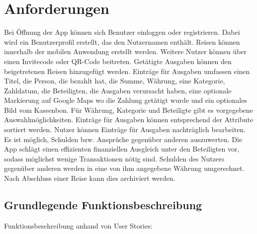 \section{Anforderungen}

Bei Öffnung der App können sich Benutzer einloggen oder registrieren.
Dabei wird ein Benutzerprofil erstellt, das den Nutzernamen enthält.
Reisen können innerhalb der mobilen Anwendung erstellt werden.
Weitere Nutzer können über einen Invitecode oder QR-Code beitreten.
Getätigte Ausgaben können den beigetretenen Reisen hinzugefügt werden.
Einträge für Ausgaben umfassen einen Titel, die Person, die bezahlt hat, die Summe,
Währung, eine Kategorie, Zahldatum, die Beteiligten, die Ausgaben verursacht haben,
eine optionale Markierung auf Google Maps wo die Zahlung getätigt wurde und ein optionales Bild vom Kassenbon.
Für Währung, Kategorie und Beteiligte gibt es vorgegebene Auswahlmöglichkeiten.
Einträge für Ausgaben können entsprechend der Attribute sortiert werden.
Nutzer können Einträge für Ausgaben nachträglich bearbeiten.
Es ist möglich, Schulden bzw. Ansprüche gegenüber anderen auszuwerten.
Die App schlägt einen effizienten finanziellen Ausgleich unter den Beteiligten vor, sodass möglichst wenige Transaktionen nötig sind.
Schulden des Nutzers gegenüber anderen werden in eine von ihm angegebene Währung umgerechnet.
Nach Abschluss einer Reise kann dies archiviert werden.

\subsection{Grundlegende Funktionsbeschreibung}

Funktionsbeschreibung anhand von User Stories:

